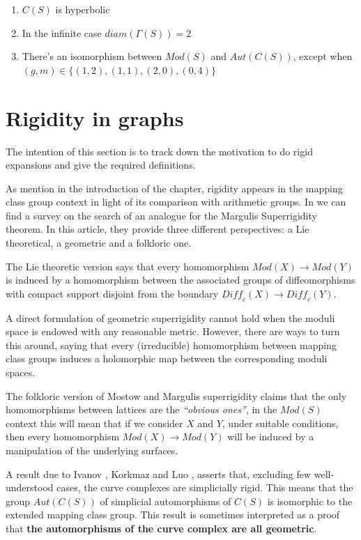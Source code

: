 \begin{enumerate}
\item $C(S)$ is hyperbolic
\item In the infinite case $diam(\Gamma(S))= 2$
\item There's an isomorphism between $Mod(S)$ and $Aut(C(S))$, except when $(g,m) \in \{(1,2), (1,1), (2,0), (0,4)\}$
\end{enumerate}

\section{Rigidity in graphs}

The intention of this section is to track down the motivation to do rigid expansions and give the required definitions.

As mention in the introduction of the chapter, rigidity appears in the mapping class group context in light of its comparison with arithmetic groups. In \cite[Aramayona, S.]{rigidityJA} we can find a survey on the search of an analogue for the Margulis Superrigidity theorem. In this article, they provide three different perspectives: a Lie theoretical, a geometric and a folkloric one.

The Lie theoretic version says that every homomorphism $Mod(X) \to Mod(Y)$ is induced by a homomorphism between the associated groups of diffeomorphisms with compact support disjoint from the boundary $\textit{Diff}_{c}(X) \to \textit{Diff}_{c}(Y)$.

A direct formulation of geometric superrigidity cannot hold when the moduli space is endowed with any reasonable metric. However, there are ways to turn this around, saying that every (irreducible) homomorphism between mapping class groups induces a holomorphic map between the corresponding moduli spaces.

The folkloric version of Mostow and Margulis superrigidity claims that the only homomorphisms between lattices are the \textit{“obvious ones”}, in the $Mod(S)$ context this will mean that if we consider $X$ and $Y$, under suitable conditions, then every homomorphism $Mod(X) \to Mod(Y)$ will be induced by a manipulation of the underlying surfaces. 

A result due to Ivanov \cite{celebratedIvanov}, Korkmaz \cite{celebratedKorkmaz} and Luo \cite{celebratedLuo}, asserts that, excluding few well-understood cases, the curve complexes are simplicially rigid. This means that the group $Aut(C(S))$ of simplicial automorphisms of $C(S)$ is isomorphic to the extended mapping class group. This result is sometimes interpreted as a proof that \textbf{the automorphisms  of  the  curve  complex  are  all geometric}.

